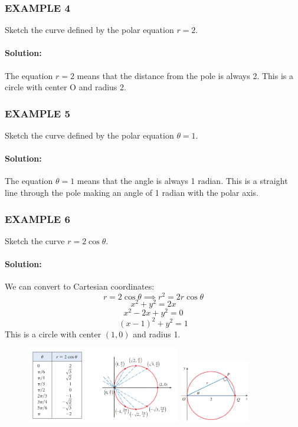 \documentclass{article}
\begin{document}
\subsubsection*{EXAMPLE 4}
Sketch the curve defined by the polar equation $r=2$.

\paragraph{Solution:} The equation $r=2$ means that the distance from the pole is always 2. This is a circle with center O and radius 2.

\subsubsection*{EXAMPLE 5}
Sketch the curve defined by the polar equation $\theta=1$.

\paragraph{Solution:} The equation $\theta=1$ means that the angle is always 1 radian. This is a straight line through the pole making an angle of 1 radian with the polar axis.

\subsubsection*{EXAMPLE 6}
Sketch the curve $r=2\cos\theta$.

\paragraph{Solution:} We can convert to Cartesian coordinates:
\[ r = 2\cos\theta \implies r^2 = 2r\cos\theta \]
\[ x^2 + y^2 = 2x \]
\[ x^2 - 2x + y^2 = 0 \]
\[ (x-1)^2 + y^2 = 1 \]
This is a circle with center $(1,0)$ and radius 1.
\begin{figure}[htbp]
    \centering
    \includegraphics[width=0.6\textwidth]{graph35.png}
    \includegraphics[width=0.27\textwidth]{graph37.png}
\end{figure}
\end{document}
